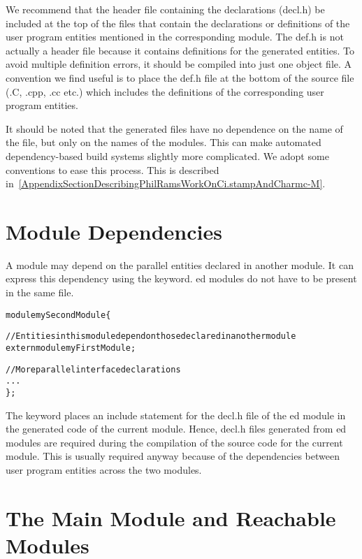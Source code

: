 We recommend that the header file containing the declarations (decl.h) be
included at the top of the files that contain the declarations or definitions
of the user program entities mentioned in the corresponding module. The def.h
is not actually a header file because it contains definitions for the generated
entities. To avoid multiple definition errors, it should be compiled into just
one object file. A convention we find useful is to place the def.h file at the
bottom of the source file (.C, .cpp, .cc etc.) which includes the definitions
of the corresponding user program entities.

\experimental
It should be noted that the generated files have no dependence on the name of the \ci
file, but only on the names of the modules. This can make automated dependency-based
build systems slightly more complicated. We adopt some conventions to ease this process.
This is described in~\ref{AppendixSectionDescribingPhilRamsWorkOnCi.stampAndCharmc-M}.


\section{Module Dependencies}

A module may depend on the parallel entities declared in another module. It can
express this dependency using the  keyword. ed modules
do not have to be present in the same \ci file.

\begin{alltt}
module mySecondModule \{

    // Entities in this module depend on those declared in another module
    extern module myFirstModule;

    // More parallel interface declarations
    ...
\};
\end{alltt}

The  keyword places an include statement for the decl.h file of the
ed module in the generated code of the current module. Hence,
decl.h files generated from ed modules are required during the
compilation of the source code for the current module. This is usually required
anyway because of the dependencies between user program entities across the two
modules.

\section{The Main Module and Reachable Modules}

